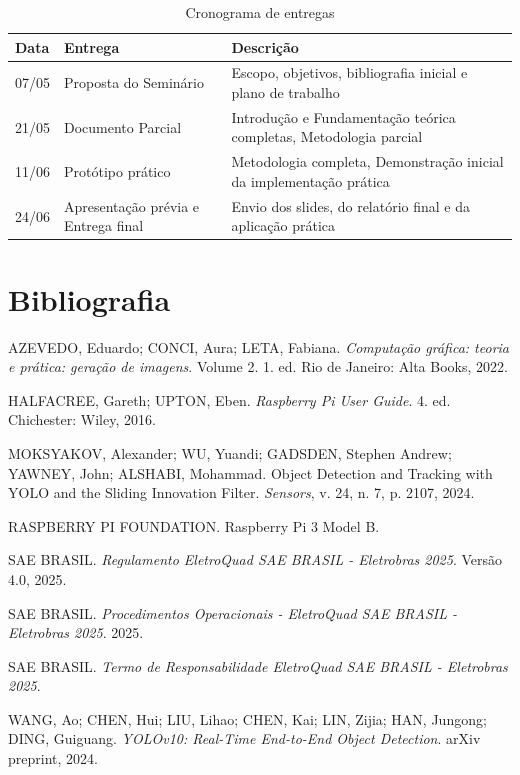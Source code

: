 \documentclass{SBCbookchapter}
\begin{document}
\begin{table}[h!]
	\centering
	\caption{Cronograma de entregas}
	\label{tab:cronograma_entregas}
	\begin{tabular}{@{}llp{8cm}@{}}
		\toprule
		\textbf{Data} & \textbf{Entrega} & \textbf{Descrição} \\
        \midrule
		07/05 & Proposta do Seminário & Escopo, objetivos, bibliografia inicial e plano de trabalho \\
		21/05 & Documento Parcial & Introdução e Fundamentação teórica completas, Metodologia parcial \\
		11/06 & Protótipo prático & Metodologia completa, Demonstração inicial da implementação prática \\
		24/06 & Apresentação prévia e Entrega final & Envio dos slides, do relatório final e da aplicação prática \\
        \bottomrule
	\end{tabular}
\end{table}

\section{Bibliografia}
\noindent
AZEVEDO, Eduardo; CONCI, Aura; LETA, Fabiana. \textit{Computação gráfica: teoria e prática: geração de imagens}. Volume 2. 1. ed. Rio de Janeiro: Alta Books, 2022.
\vspace{0.2cm}

\noindent
HALFACREE, Gareth; UPTON, Eben. \textit{Raspberry Pi User Guide}. 4. ed. Chichester: Wiley, 2016.
\vspace{0.2cm}

\noindent
MOKSYAKOV, Alexander; WU, Yuandi; GADSDEN, Stephen Andrew; YAWNEY, John; ALSHABI, Mohammad. Object Detection and Tracking with YOLO and the Sliding Innovation Filter. \textit{Sensors}, v. 24, n. 7, p. 2107, 2024.
\vspace{0.2cm}

\noindent
RASPBERRY PI FOUNDATION. Raspberry Pi 3 Model B.
\vspace{0.2cm}

\noindent
SAE BRASIL. \textit{Regulamento EletroQuad SAE BRASIL - Eletrobras 2025}. Versão 4.0, 2025.
\vspace{0.2cm}

\noindent
SAE BRASIL. \textit{Procedimentos Operacionais - EletroQuad SAE BRASIL - Eletrobras 2025}. 2025.
\vspace{0.2cm}

\noindent
SAE BRASIL. \textit{Termo de Responsabilidade EletroQuad SAE BRASIL - Eletrobras 2025}.
\vspace{0.2cm}

\noindent
WANG, Ao; CHEN, Hui; LIU, Lihao; CHEN, Kai; LIN, Zijia; HAN, Jungong; DING, Guiguang. \textit{YOLOv10: Real-Time End-to-End Object Detection}. arXiv preprint, 2024.
\end{document}
